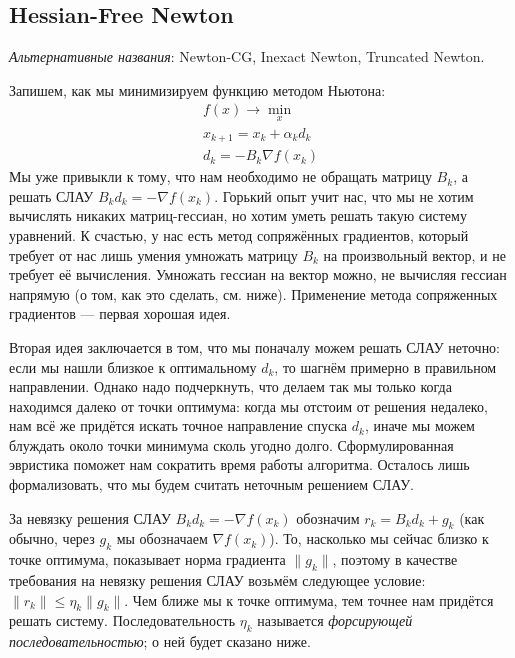 \documentclass[a4paper, 12pt]{article}
\begin{document}
\subsection{Hessian-Free Newton}
\textit{Альтернативные названия}: Newton-CG, Inexact Newton, Truncated Newton.

Запишем, как мы минимизируем функцию методом Ньютона:
\begin{gather*}
    f(x) \to \min_x \\
    x_{k+1} = x_k + \alpha_k d_k \\
    d_k = -B_k\nabla f(x_k)
\end{gather*}
Мы уже привыкли к тому, что нам необходимо не обращать матрицу $B_k$, а решать СЛАУ $B_kd_k = -\nabla f(x_k)$. Горький опыт учит нас, что мы не хотим вычислять никаких матриц-гессиан, но хотим уметь решать такую систему уравнений. К счастью, у нас есть метод сопряжённых градиентов, который требует от нас лишь умения умножать матрицу $B_k$ на произвольный вектор, и не требует её вычисления. Умножать гессиан на вектор можно, не вычисляя гессиан напрямую (о том, как это сделать, см. ниже). Применение метода сопряженных градиентов --- первая хорошая идея.

Вторая идея заключается в том, что мы поначалу можем решать СЛАУ неточно: если мы нашли близкое к оптимальному $d_k$, то шагнём примерно в правильном направлении. Однако надо подчеркнуть, что делаем так мы только когда находимся далеко от точки оптимума: когда мы отстоим от решения недалеко, нам всё же придётся искать точное направление спуска $d_k$, иначе мы можем блуждать около точки минимума сколь угодно долго. Сформулированная эвристика поможет нам сократить время работы алгоритма. Осталось лишь формализовать, что мы будем считать неточным решением СЛАУ.

За невязку решения СЛАУ $B_k d_k = -\nabla f(x_k)$ обозначим $r_k = B_kd_k + g_k$ (как обычно, через $g_k$ мы обозначаем $\nabla f(x_k)$). То, насколько мы сейчас близко к точке оптимума, показывает норма градиента $\|g_k\|$, поэтому в качестве требования на невязку решения СЛАУ возьмём следующее условие: $\|r_k\| \leq \eta_k\|g_k\|$. Чем ближе  мы к точке оптимума, тем точнее нам придётся решать систему. Последовательность $\eta_k$ называется \textit{форсирующей последовательностью}; о ней будет сказано ниже. 
\end{document}
